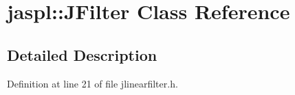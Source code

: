\hypertarget{classjaspl_1_1_j_filter}{}\section{jaspl\+:\+:J\+Filter Class Reference}
\label{classjaspl_1_1_j_filter}


\subsection{Detailed Description}


Definition at line 21 of file jlinearfilter.\+h.

